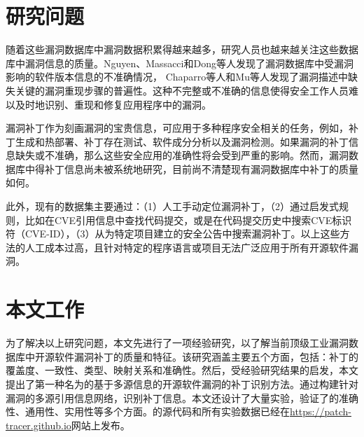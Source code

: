 \section{研究问题}
随着这些漏洞数据库中漏洞数据积累得越来越多，研究人员也越来越关注这些数据库中漏洞信息的质量。Nguyen、Massacci\cite{nguyen2013reliability}和Dong等人\cite{dong2019towards}发现了漏洞数据库中受漏洞影响的软件版本信息的不准确情况，
Chaparro等人\cite{chaparro2017detecting}和Mu等人\cite{mu2018understanding}发现了漏洞描述中缺失关键的漏洞重现步骤的普遍性。这种不完整或不准确的信息使得安全工作人员难以及时地识别、重现和修复应用程序中的漏洞。

漏洞补丁作为刻画漏洞的宝贵信息，可应用于多种程序安全相关的任务，例如，补丁生成和热部署\cite{mulliner2013patchdroid,duan2019automating,xu2020automatic}、补丁存在测试\cite{zhang2018precise,jiang2020pdiff,dai2020bscout}、软件成分分析\cite{ponta2020detection,pashchenko2020vuln4real,Wang2020empirical}以及漏洞检测\cite{li2016vulpecker,li2018vuldeepecker,jang2012redebug,kim2017vuddy, xiao2020mvp, cui2020vuldetector}。如果漏洞的补丁信息缺失或不准确，那么这些安全应用的准确性将会受到严重的影响。然而，漏洞数据库中得补丁信息尚未被系统地研究，目前尚不清楚现有漏洞数据库中补丁的质量如何。

此外，现有的数据集主要通过：（1）人工手动定位漏洞补丁\cite{xu2020automatic,jiang2020pdiff,dai2020bscout,zhou2017automated,sabetta2018practical,chen2020machine,xiao2020mvp,ponta2020detection,pashchenko2020vuln4real}，（2）通过启发式规则，比如在CVE引用信息中查找代码提交\cite{duan2019automating,li2016vulpecker}，或是在代码提交历史中搜索CVE标识符（CVE-ID）\cite{you2017semfuzz,Wang2020empirical}，（3）从为特定项目建立的安全公告中搜索漏洞补丁\cite{mulliner2013patchdroid,jang2012redebug,kim2017vuddy}。以上这些方法的人工成本过高，且针对特定的程序语言或项目无法广泛应用于所有开源软件漏洞。

\section{本文工作}
为了解决以上研究问题，本文先进行了一项经验研究，以了解当前顶级工业漏洞数据库中开源软件漏洞补丁的质量和特征。该研究涵盖主要五个方面，包括：补丁的覆盖度、一致性、类型、映射关系和准确性。然后，受经验研究结果的启发，本文提出了第一种名为\tool 的基于多源信息的开源软件漏洞的补丁识别方法。通过构建针对漏洞的多源引用信息网络，识别补丁信息。本文还设计了大量实验，验证了\tool 的准确性、通用性、实用性等多个方面。\tool 的源代码和所有实验数据已经在\url{https://patch-tracer.github.io}网站上发布。


